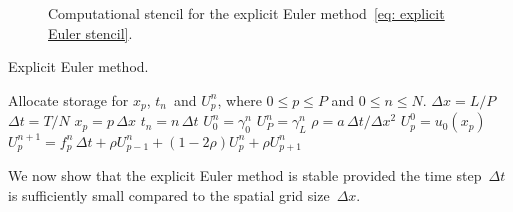 \begin{figure}
\caption{Computational stencil for the explicit Euler 
method~\eqref{eq: explicit Euler stencil}.}
\label{fig: explicit Euler stencil}
\begin{center}
\end{center}
\end{figure}

\begin{algorithm}
\caption{Explicit Euler method.}
\label{alg: explicit Euler}
\begin{algorithmic}
\State Allocate storage for $x_p$, $t_n$~and $U^n_p$, where $0\le p\le P$ and 
$0\le n\le N$.
\State $\Delta x=L/P$ 
\State$\Delta t=T/N$
    \State $x_p=p\,\Delta x$
\EndFor
{}
    \State $t_n=n\,\Delta t$
    \State $U^n_0=\gamma_0^n$
    \State $U^n_P=\gamma_L^n$
\EndFor
\State $\rho=a\,\Delta t/\Delta x^2$
    \State $U^0_p=u_0(x_p)$
\EndFor
{}
        \State $U^{n+1}_p=f^n_p\,\Delta t
                +\rho U^n_{p-1}+(1-2\rho)U^n_p+\rho U^n_{p+1}$
    \EndFor                
\EndFor
\end{algorithmic}
\end{algorithm}

We now show that the explicit Euler method is stable provided the time 
step~$\Delta t$ is sufficiently small compared to the spatial grid 
size~$\Delta x$.

